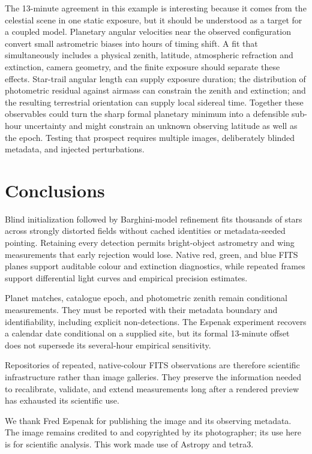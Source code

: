 \documentclass{aa}
\begin{document}
The 13-minute agreement in this example is interesting because it comes from
the celestial scene in one static exposure, but it should be understood as a
target for a coupled model. Planetary angular velocities near the observed
configuration convert small astrometric biases into hours of timing shift. A
fit that simultaneously includes a physical zenith, latitude, atmospheric
refraction and extinction, camera geometry, and the finite exposure should
separate these effects. Star-trail angular length can supply exposure duration;
the distribution of photometric residual against airmass can constrain the
zenith and extinction; and the resulting terrestrial orientation can supply
local sidereal time. Together these observables could turn the sharp formal
planetary minimum into a defensible sub-hour uncertainty and might constrain an
unknown observing latitude as well as the epoch. Testing that prospect requires
multiple images, deliberately blinded metadata, and injected perturbations.

\section{Conclusions}

Blind initialization followed by Barghini-model refinement fits thousands of
stars across strongly distorted fields without cached identities or
metadata-seeded pointing. Retaining every detection permits bright-object
astrometry and wing measurements that early rejection would lose. Native red,
green, and blue FITS planes support auditable colour and extinction
diagnostics, while repeated frames support differential light curves and
empirical precision estimates.

Planet matches, catalogue epoch, and photometric zenith remain conditional
measurements. They must be reported with their metadata boundary and
identifiability, including explicit non-detections. The Espenak experiment
recovers a calendar date conditional on a supplied site, but its formal
13-minute offset does not supersede its several-hour empirical sensitivity.

Repositories of repeated, native-colour FITS observations are therefore
scientific infrastructure rather than image galleries. They preserve the
information needed to recalibrate, validate, and extend measurements long
after a rendered preview has exhausted its scientific use.

\begin{acknowledgements}
We thank Fred Espenak for publishing the image and its observing metadata. The
image remains credited to and copyrighted by its photographer; its use here is
for scientific analysis. This work made use of Astropy and tetra3.
\end{acknowledgements}
\end{document}
